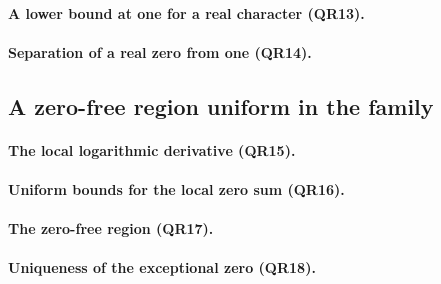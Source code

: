 \]

\paragraph{A lower bound at one for a real character (QR13).}



\paragraph{Separation of a real zero from one (QR14).}



\subsection{A zero-free region uniform in the family}

\paragraph{The local logarithmic derivative (QR15).}



\paragraph{Uniform bounds for the local zero sum (QR16).}



\paragraph{The zero-free region (QR17).}



\paragraph{Uniqueness of the exceptional zero (QR18).}

